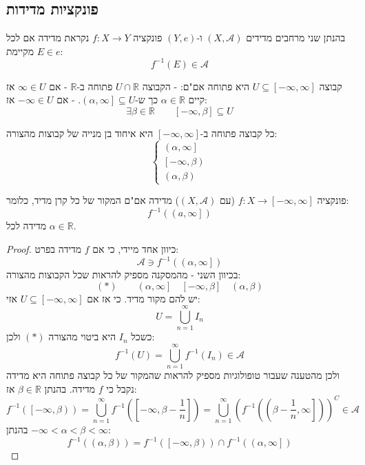\documentclass{tstextbook}
\begin{document}
\subsection{פונקציות מדידות}

\begin{definition}
בהנתן שני מרחבים מדידים \((X,\mathcal{A})\) ו-\((Y,e)\) פונקציה \(f:X\to Y\) נקראת מדידה אם לכל \(E \in e\) מקיימת:
$$f^{-1} (E) \in \mathcal{A}$$

\end{definition}
\begin{reminder}
קבוצה \(U\subseteq \left[ -\infty,\infty \right]\) היא פתוחה אם"ם:
- הקבוצה \(U\cap \mathbb{R}\) פתוחה ב-\(\mathbb{R}\)
- אם \(\infty \in U\) אז קיים \(\alpha \in \mathbb{R}\) כך ש-\(\left( \alpha,\infty \right]\subseteq U\).
- אם \(-\infty \in U\) אז:
$$\exists \beta \in \mathbb{R} \qquad  \left[ -\infty,\beta \right]\subseteq U$$

\end{reminder}
\begin{corollary}
כל קבוצה פתוחה ב-\(\left[ -\infty,\infty \right]\) היא איחוד בן מנייה של קבוצות מהצורה:
$$\begin{cases}\left( \alpha,\infty \right] \\\left[ -\infty,\beta \right) \\\left( \alpha,\beta \right)
\end{cases}$$

\end{corollary}
\begin{proposition}
פונקציה \(f:X\to \left[ -\infty,\infty \right]\) (עם \((X,\mathcal{A})\)) מדידה אם"ם המקור של כל קרן מדיד, כלומר:
$$f^{-1}\left( \left( a,\infty \right] \right)$$
מדידה לכל \(\alpha \in \mathbb{R}\).

\end{proposition}
\begin{proof}
כיוון אחד מיידי, כי אם \(f\) מדידה בפרט:
$$\mathcal{A} \ni f^{-1}\left( \left( \alpha,\infty \right] \right)$$
בכיוון השני - מהמסקנה מספיק להראות שכל הקבוצות מהצורה:
$$(*)\qquad \left( \alpha,\infty \right]\quad \left[ -\infty,\beta \right]\quad \left( \alpha,\beta \right)$$
יש להם מקור מדיד. כי אז אם \(U\subseteq \left[ -\infty,\infty \right]\) אזי:
$$U=\bigcup_{n=1}^{\infty} I_{n}$$
כשכל \(I_{n}\) היא ביטוי מהצורה \((*)\) ולכן:
$$f^{-1}(U)=\bigcup_{n=1}^{\infty} f^{-1}(I_{n}) \in \mathcal{A}$$
ולכן מהטענה שעבור טופולוגיות מספיק להראות שהמקור של כל קבוצה פתוחה היא מדידה נקבל כי \(f\) מדידה. בהנתן \(\beta \in \mathbb{R}\) אז:
$$f^{-1}\left( \left[ -\infty,\beta \right) \right)=\bigcup _{n=1}^{\infty}f^{-1}\left( \left[ -\infty,\beta-\frac{1}{n} \right] \right)=\bigcup_{n=1}^{\infty}\left( f^{-1}\left( \left( \beta-\frac{1}{n},\infty \right] \right) \right)^{C}\in \mathcal{A}$$
בהנתן \(-\infty<\alpha<\beta<\infty\):
$$f^{-1}\left( \left( \alpha,\beta \right) \right)=f^{-1}\left( \left[ -\infty,\beta \right) \right)\cap f^{-1}\left( \left( \alpha,\infty \right] \right)$$

\end{proof}
\end{document}
